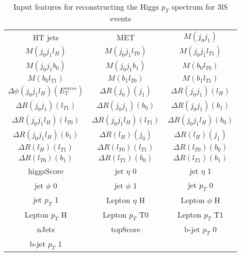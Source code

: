 \begin{table}[H]
  \begin{center}
  \begin{tabular}{ccc}
    \hline\hline
    HT jets & MET & $M(j_0j_1)$ \\
    $M(j_0j_1l_{H})$ & $M(j_0j_1l_{T0})$ & $M(j_0j_1l_{T1})$ \\
    $M(j_0j_1b_0)$ & $M(j_0j_1b_1)$ & $M(b_0l_{T0})$ \\
    $M(b_0l_{T1})$ & $M(b_1l_{T0})$ & $M(b_1l_{T1})$ \\
    $\Delta\phi(j_0j_1l_{H})(E_T^{miss})$ & $\Delta R(j_0)(j_1)$ & $\Delta R(j_0j_1)(l_{H})$ \\
    $\Delta R(j_0j_1)(l_{T1})$ & $\Delta R(j_0j_1)(b_0)$ & $\Delta R(j_0j_1)(b_1)$ \\
    $\Delta R(j_0j_1l_{H})(l_{T0})$ & $\Delta R(j_0j_1l_{H})(l_{T1})$ & $\Delta R(j_0j_1l_{H})(b_0)$ \\
    $\Delta R(j_0j_1l_{H})(b_1)$ & $\Delta R(l_{H})(j_0)$ & $\Delta R(l_{H})(j_1)$ \\
    $\Delta R(l_{H})(l_{T1})$ & $\Delta R(l_{T0})(l_{T1})$ & $\Delta R(l_{T0})(b_0)$ \\
    $\Delta R(l_{T0})(b_1)$ & $\Delta R(l_{T1})(b_0)$ & $\Delta R(l_{T1})(b_1)$ \\
    higgsScore & jet  $\eta$ 0 & jet  $\eta$ 1 \\
    jet $\phi$ 0 & jet $\phi$ 1 & jet  $p_T$ 0 \\
    jet  $p_T$ 1 & Lepton  $\eta$ H & Lepton $\phi$ H \\
    Lepton  $p_T$ H & Lepton  $p_T$ T0 & Lepton  $p_T$ T1 \\
    nJets & topScore & b-jet $p_T$ 0 \\
    b-jet $p_T$ 1 & & \\
    \hline
  \end{tabular}
  \end{center}
  \caption{Input features for reconstructing the Higgs $p_T$ spectrum for 3lS events}
  \label{tab:pt3lSfeatures}
\end{table}
